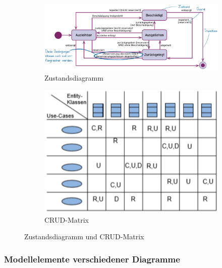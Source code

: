 \documentclass[a4paper]{article}
\begin{document}
			\begin{figure}[!htb]
				\centering
				\begin{subfigure}{.45\textwidth}
					\centering
					\includegraphics[width=\textwidth]{img/re/03/state_dia.png}
					\caption{Zustandsdiagramm}
					\label{fig:re_state_dia}
				\end{subfigure}
				\begin{subfigure}{.45\textwidth}
					\centering
					\includegraphics[width=\textwidth]{img/re/03/crud_matrix_dia.png}
					\caption{CRUD-Matrix}
					\label{fig:re_crud_dia}
				\end{subfigure}
				\caption{Zustandsdiagramm und CRUD-Matrix}
				\label{fig:re_state_crud_dia}
			\end{figure}
		
\newpage

			\subsubsection{Modellelemente verschiedener Diagramme}
			
\end{document}
